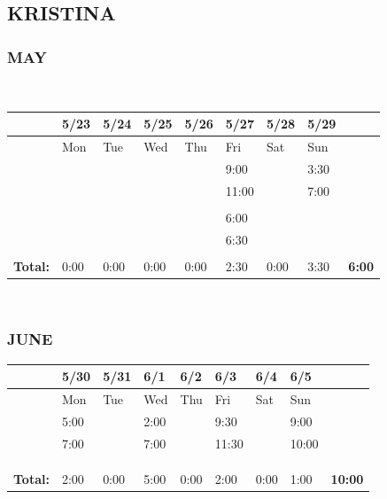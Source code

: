 \documentclass{article}
\begin{document}
\newpage

\subsection{KRISTINA} 

\subsubsection*{MAY} 
\\
\begin{tabular}{ |m{1cm}||m{1cm}|m{1cm}|m{1cm}|m{1cm}|m{1cm}|m{1cm}|m{1cm}||m{1cm}|} 
\hline
 & 5/23 & 5/24 & 5/25 & 5/26 & 5/27 & 5/28 & 5/29 & \\ 
\hline
\rowcolor{lightgray} 
\cellcolor{white} & Mon & Tue & Wed & Thu & Fri & Sat & Sun & \cellcolor{white}\\ 
\hline
\hline
 & & & & & 9:00 & & 3:30 & \\ 
\hline
 & & & & & 11:00 & & 7:00 & \\ 
\hline
 & & & & & & & & \\ 
\hline
 & & & & & 6:00 & & & \\ 
\hline
 & & & & & 6:30 & & & \\ 
\hline
 & & & & & & & & \\
\hline
\textbf{Total:} & 0:00 & 0:00 & 0:00 & 0:00 & 2:30 & 0:00 & 3:30 & \textbf{6:00} \\
\hline
\end{tabular} \\

\vspace{0.2in}

\subsubsection*{JUNE} 
\begin{tabular}{ |m{1cm}||m{1cm}|m{1cm}|m{1cm}|m{1cm}|m{1cm}|m{1cm}|m{1cm}||m{1cm}|} 
\hline
 & 5/30 & 5/31 & 6/1 & 6/2 & 6/3 & 6/4 & 6/5 & \\ 
\hline
\rowcolor{lightgray} 
\cellcolor{white} & Mon & Tue & Wed & Thu & Fri & Sat & Sun & \cellcolor{white}\\ 
\hline
\hline
 & 5:00 & & 2:00 & & 9:30 & & 9:00 & \\ 
\hline
 & 7:00 & & 7:00 & & 11:30 & & 10:00 & \\ 
\hline
 & & & & & & & & \\ 
\hline
 & & & & & & & & \\ 
\hline
 & & & & & & & & \\ 
\hline
\textbf{Total:} & 2:00 & 0:00 & 5:00 & 0:00 & 2:00 & 0:00 & 1:00 & \textbf{10:00} \\
\hline
\end{tabular} 
\end{document}

